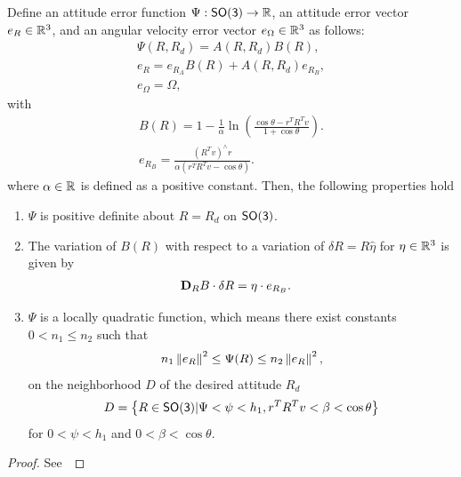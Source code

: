 \begin{prop} \label{prop:repulsive_configuration_error}
Define an attitude error function \( \Psi : \mathsf{SO(3)} \to \mathbb{R} \), an attitude error vector \( e_R \in \mathbb{R}^3 \), and an angular velocity error vector \( e_\Omega \in \mathbb{R}^3 \) as follows:
\begin{gather}
	\Psi(R, R_d) = A(R, R_d) B(R) , \label{eqn:psi} \\
	e_R = e_{R_A} B(R) + A(R,R_d) e_{R_B} , \label{eqn:eR} \\
	e_\Omega = \Omega , \label{eqn:eW}
\end{gather}
with
\begin{gather}
	B(R) = 1 - \frac{1}{\alpha} \ln \left( \frac{\cos \theta -  r^T R^T v}{1 + \cos \theta}\right). \label{eq:B} \\
	e_{R_B} = \frac{\left( R^T v\right)^\wedge r}{\alpha \left(r^T R^T v - \cos \theta \right)}. \label{eq:eRB} 
\end{gather}	
where \( \alpha \in \mathbb{R} \) is defined as a positive constant.
Then, the following properties hold
\begin{enumerate}
	\item \label{item:prop_psi_psd} \(\Psi\) is positive definite about \( R = R_d\) on $\mathsf{SO(3)}$.
	\item \label{item:prop_erb} The variation of \( B(R) \) with respect to a variation of \( \delta R = R \hat{\eta} \) for \( \eta \in \mathbb{R}^3 \) is given by
	\begin{align}\label{eq:dirDiff_B}
		\mathbf{D}_{R} B \cdot \delta R &= \eta \cdot e_{R_{B}}.
	\end{align}
    \item \label{item:prop_psi_quadratic} \( \Psi \) is a locally quadratic function, which means there exist constants \( 0 < n_1 \leq n_2 \) such that
    \begin{align}\label{eq:psi_bound}
        n_1 \left\| e_R \right\|^2 \leq \Psi(R) \leq n_2 \left\| e_R \right\|^2 ,
    \end{align}
    on the neighborhood $D$ of the desired attitude \( R_d \)
    \begin{align}\label{eq:psi_quadratic_domain}
        D = \left\{ R\in\mathsf{SO(3)}  \vert \Psi < \psi < h_1, r^T R^T v < \beta < \cos \theta \right\}
    \end{align}
    for $0<\psi < h_1 $ and $0< \beta<\cos\theta$. 
\end{enumerate}
\end{prop}
\begin{proof}
    See~
\end{proof}

